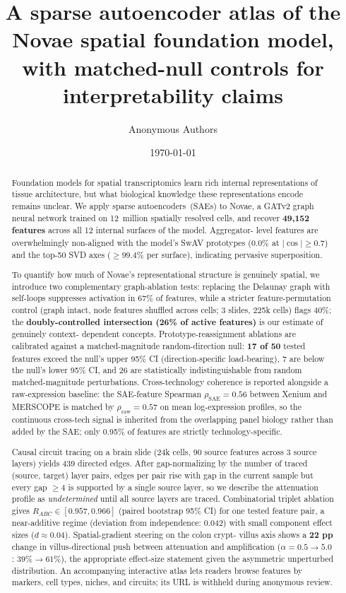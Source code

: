 \documentclass[11pt]{article}
\title{A sparse autoencoder atlas of the Novae spatial foundation model,\\with matched-null controls for interpretability claims}
\author[1]{Anonymous Authors}
\affil[1]{Submission under double-blind review}
\date{\today}
\begin{document}
\maketitle

\begin{abstract}
Foundation models for spatial transcriptomics learn rich internal
representations of tissue architecture, but what biological knowledge
these representations encode remains unclear. We apply sparse
autoencoders~(SAEs) to Novae, a GATv2 graph neural network trained on
12~million spatially resolved cells, and recover \textbf{49{,}152
features} across all 12 internal surfaces of the model. Aggregator-
level features are overwhelmingly non-aligned with the model's SwAV
prototypes (0.0\% at $|\cos|\geq 0.7$) and the top-50 SVD axes
($\geq 99.4\%$ per surface), indicating pervasive superposition.

To quantify how much of Novae's representational structure is
genuinely spatial, we introduce two complementary graph-ablation
tests: replacing the Delaunay graph with self-loops suppresses
activation in 67\% of features, while a stricter feature-permutation
control (graph intact, node features shuffled across cells; 3 slides,
225k cells) flags 40\%; the \textbf{doubly-controlled intersection
(26\% of active features)} is our estimate of genuinely context-
dependent concepts. Prototype-reassignment ablations are calibrated
against a matched-magnitude random-direction null: \textbf{17 of 50}
tested features exceed the null's upper 95\% CI (direction-specific
load-bearing), 7 are below the null's lower 95\% CI, and 26 are
statistically indistinguishable from random matched-magnitude
perturbations. Cross-technology coherence is reported alongside a
raw-expression baseline: the SAE-feature Spearman
$\rho_\text{SAE} = 0.56$ between Xenium and MERSCOPE is matched by
$\rho_\text{raw} = 0.57$ on mean log-expression profiles, so the
continuous cross-tech signal is inherited from the overlapping panel
biology rather than added by the SAE; only 0.95\% of features are
strictly technology-specific.

Causal circuit tracing on a brain slide (24k cells, 90 source
features across 3 source layers) yields 439 directed edges. After
gap-normalizing by the number of traced (source, target) layer pairs,
edges per pair rise with gap in the current sample but every gap
$\geq 4$ is supported by a single source layer, so we describe the
attenuation profile as \emph{undetermined} until all source layers
are traced. Combinatorial triplet ablation gives
$R_{ABC} \in [0.957, 0.966]$ (paired bootstrap 95\% CI) for one
tested feature pair, a near-additive regime (deviation from
independence: 0.042) with small component effect sizes
($d \approx 0.04$). Spatial-gradient steering on the colon crypt-
villus axis shows a \textbf{22 pp} change in villus-directional push
between attenuation and amplification ($\alpha = 0.5 \to 5.0$:
$39\% \to 61\%$), the appropriate effect-size statement given the
asymmetric unperturbed distribution. An accompanying interactive
atlas lets readers browse features by markers, cell types, niches,
and circuits; its URL is withheld during anonymous review.
\end{abstract}
\end{document}
